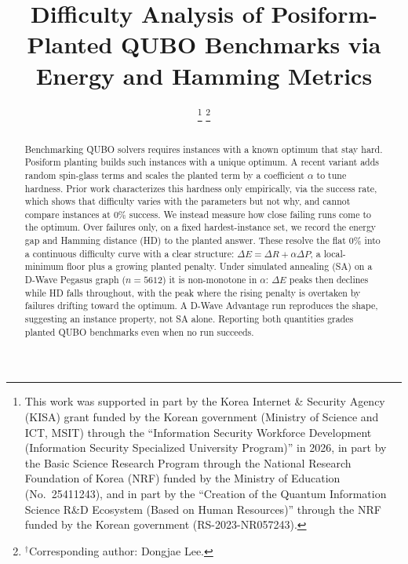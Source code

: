\documentclass[10pt, conference]{IEEEtran}
\begin{document}
\title{Difficulty Analysis of Posiform-Planted QUBO Benchmarks via Energy and Hamming Metrics}

\author{
\and
{}
\thanks{This work was supported in part by the Korea Internet \& Security Agency
(KISA) grant funded by the Korean government (Ministry of Science and ICT,
MSIT) through the ``Information Security Workforce Development (Information
Security Specialized University Program)'' in 2026, in part by the Basic Science
Research Program through the National Research Foundation of Korea (NRF) funded
by the Ministry of Education (No.~25411243), and in part by the ``Creation of the
Quantum Information Science R\&D Ecosystem (Based on Human Resources)'' through
the NRF funded by the Korean government (RS-2023-NR057243).}
\thanks{$^{\dagger}$Corresponding author: Dongjae Lee.}
}

\maketitle

\begin{abstract}
Benchmarking QUBO solvers requires instances with a known optimum that stay hard.
Posiform planting builds such instances with a unique optimum. A recent variant
adds random spin-glass terms and scales the planted term by a coefficient
$\alpha$ to tune hardness. Prior work characterizes this hardness only
empirically, via the success rate, which shows that difficulty varies with the
parameters but not why, and cannot compare instances at $0\%$ success. We instead measure how close failing runs come to the optimum. Over
failures only, on a fixed hardest-instance set, we record the energy gap and
Hamming distance (HD) to the planted answer. These resolve the flat $0\%$ into a continuous difficulty curve with a clear
structure: $\Delta E = \Delta R + \alpha\Delta P$, a local-minimum floor plus a
growing planted penalty. Under simulated annealing (SA) on a D-Wave Pegasus
graph ($n{=}5612$) it is non-monotone in $\alpha$: $\Delta E$ peaks then declines
while HD falls throughout, with the peak where the rising penalty is overtaken
by failures drifting toward the optimum. A D-Wave Advantage run reproduces the
shape, suggesting an instance property, not SA alone.
Reporting both quantities grades planted QUBO benchmarks even when no run
succeeds.
\end{abstract}
\end{document}
